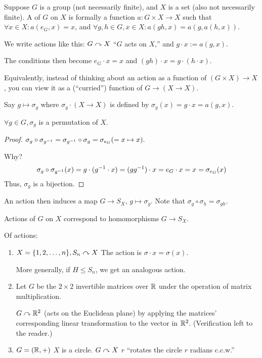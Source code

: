 \documentclass[notes.tex]{subfiles}
\begin{document}
\begin{defn}
	Suppose $G$ is a group (not necessarily finite), and $X$ is a set (also not necessarily finite). A  of $G$ on $X$ is formally a function $a :G\times X\to X$ such that $\forall x\in X: a(e_G, x) = x$, and $\forall g, h\in G, x\in X: a(gh, x) = a(g, a(h, x))$.
\end{defn}

\begin{notation}
	We write actions like this:
	$G\curvearrowright X$ ``$G$ acts on $X$,'' and $g\cdot x := a(g, x)$.

	The conditions then become $e_G\cdot x = x$ and $(gh)\cdot x = g\cdot(h\cdot x)$.
\end{notation}
Equivalently, instead of thinking about an action as a function of $(G\times X) \to X$, you can view it as a (``curried'') function of $G \to (X\to X)$.

Say $g\mapsto \sigma_g$ where $\sigma_g\cdot (X\to X)$ is defined by $\sigma_g(x) = g\cdot x = a(g, x)$.

\begin{claim}
	$\forall g\in G, \sigma_g$ is a permutation of $X$.
\end{claim}
\begin{proof}
	$\sigma_g\circ \sigma_{{g}^{-1}}  = \sigma_{{g}^{-1}} \circ \sigma_g = \sigma_{e_G} (= x\mapsto x).$

	Why?
	\[
		\sigma_g\circ\sigma_{{g}^{-1}}(x) = g\cdot({g}^{-1}\cdot x) = (g{g}^{-1})\cdot x = e_G\cdot x = x = \sigma_{e_G}(x)
	\]
	Thus, $\sigma_g$ is a bijection.
\end{proof}

An action then induces a map $G\to S_X$, $g\mapsto \sigma_g$.
Note that $\sigma_g\circ\sigma_h = \sigma_{gh}$.

\begin{property}
	Actions of $G$ on $X$ correspond to homomorphisms $G\to S_X$.
\end{property}

\begin{eg}
	Of actions:
	\begin{enumerate}
		\item $X = \{1, 2, \ldots, n\}, S_n\curvearrowright X$
		The action is $\sigma\cdot x = \sigma(x)$.

		More generally, if $H\le S_n$, we get an analogous action.
		\item Let $G$ be the  $2\times2$ invertible matrices over $\mathbb{R}$ under the operation of matrix multiplication.

		$G\curvearrowright \mathbb{R}^2$ (acts on the Euclidean plane) by applying the matrices' corresponding linear transformation to the vector in $\mathbb{R}^2$. (Verification left to the reader.)
		\item $G = (\mathbb{R}, +)$ $X$ is a circle.
		$G\curvearrowright X$ $r$ ``rotates the circle $r$ radians c.c.w.''
	\end{enumerate}
\end{eg}
\end{document}
